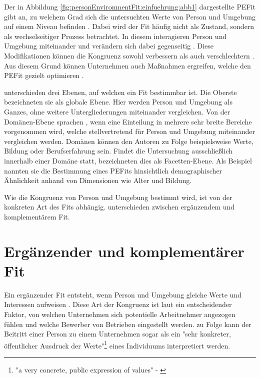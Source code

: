 Der in Abbildung \ref{fig:personEnvironmentFit:einfuehrung:abb1} dargestellte \ac{PEFit} gibt an, zu welchem Grad sich die untersuchten Werte von Person und Umgebung auf einem Niveau befinden \cite[S. 53]{edwards:2008}. Dabei wird der Fit häufig nicht als Zustand, sondern als wechselseitiger Prozess betrachtet. In diesem interagieren Person und Umgebung miteinander und verändern sich dabei gegenseitig \cite[S. 10ff.]{su:2015}. Diese Modifikationen können die Kongruenz sowohl verbessern als auch verschlechtern \cite[S. 4]{caplan:1987}. Aus diesem Grund können Unternehmen auch Maßnahmen ergreifen, welche den \ac{PEFit} gezielt optimieren \cite[S. 16]{cable:2001}.

\textcite[S. 6ff.]{edwards:2007} unterschieden drei Ebenen, auf welchen ein Fit bestimmbar ist. Die Oberste bezeichneten sie als globale Ebene. Hier werden Person und Umgebung als Ganzes, ohne weitere Untergliederungen miteinander vergleichen. Von der Domänen-Ebene sprachen \textcite[S. 7f.]{edwards:2007}, wenn eine Einteilung in mehrere sehr breite Bereiche vorgenommen wird, welche stellvertretend für Person und Umgebung miteinander vergleichen werden. Domänen können den Autoren zu Folge beispielsweise Werte, Bildung oder Berufserfahrung sein. Findet die Untersuchung ausschließlich innerhalb einer Domäne statt, bezeichneten \textcite[S. 7f.]{edwards:2007} dies als Facetten-Ebene. Als Beispiel nannten sie die Bestimmung eines \acp{PEFit} hinsichtlich demographischer Ähnlichkeit anhand von Dimensionen wie Alter und Bildung.

Wie die Kongruenz von Person und Umgebung bestimmt wird, ist von der konkreten Art des Fits abhängig. \textcite[S. 1]{muchinsky:1987} unterschieden zwischen ergänzendem und komplementärem Fit.

\section{Ergänzender und komplementärer Fit}
\label{ch:personEnvironmentFit:supplementaryUndComplementary}
Ein ergänzender Fit entsteht, wenn Person und Umgebung gleiche Werte und Interessen aufweisen \cite[S. 2ff.]{muchinsky:1987}. Diese Art der Kongruenz ist laut \textcite[S. 5ff.]{schneider:1987} ein entscheidender Faktor, von welchen Unternehmen sich potentielle Arbeitnehmer angezogen fühlen und welche Bewerber von Betrieben eingestellt werden. \textcite[S. 4, Z. 47f.]{popovich:1982} zu Folge kann der Beitritt einer Person zu einem Unternehmen sogar als ein "sehr konkreter, öffentlicher Ausdruck der Werte"\footnote{"a very concrete, public expression of values" - \textcite[S. 4, Z. 47f.]{popovich:1982}} eines Individuums interpretiert werden.

